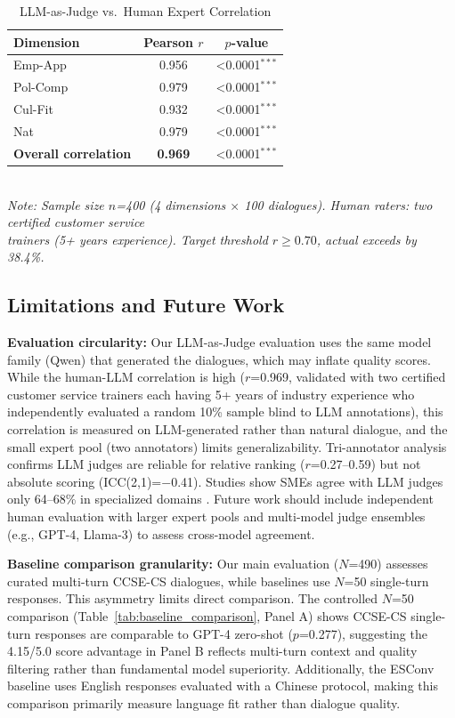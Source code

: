 \documentclass[11pt]{article}
\begin{document}
\begin{table}[t]
\begin{table}[t]
\centering
\caption{LLM-as-Judge vs.\ Human Expert Correlation}
\label{tab:llm_human_correlation}
\begin{tabular}{lcc}
\toprule
\textbf{Dimension} & \textbf{Pearson $r$} & \textbf{$p$-value} \\
\midrule
Emp-App & 0.956 & <0.0001$^{***}$ \\
Pol-Comp & 0.979 & <0.0001$^{***}$ \\
Cul-Fit & 0.932 & <0.0001$^{***}$ \\
Nat & 0.979 & <0.0001$^{***}$ \\
\midrule
\textbf{Overall correlation} & \textbf{0.969} & <0.0001$^{***}$ \\
\bottomrule
\end{tabular}
\smallskip
\\
\footnotesize{\textit{Note: Sample size $n$=400 (4 dimensions $\times$ 100 dialogues). Human raters: two certified customer service}}
\\
\footnotesize{\textit{trainers (5+ years experience). Target threshold $r \geq 0.70$, actual exceeds by 38.4\%.}}
\end{table}

\subsection{Limitations and Future Work}

\textbf{Evaluation circularity:} Our LLM-as-Judge evaluation uses the same model family (Qwen) that generated the dialogues, which may inflate quality scores. While the human-LLM correlation is high ($r$=0.969, validated with two certified customer service trainers each having 5+ years of industry experience who independently evaluated a random 10\% sample blind to LLM annotations), this correlation is measured on LLM-generated rather than natural dialogue, and the small expert pool (two annotators) limits generalizability. Tri-annotator analysis confirms LLM judges are reliable for relative ranking ($r$=0.27--0.59) but not absolute scoring (ICC(2,1)=$-$0.41). Studies show SMEs agree with LLM judges only 64--68\% in specialized domains \cite{llm_judge_limitations_2025}. Future work should include independent human evaluation with larger expert pools and multi-model judge ensembles (e.g., GPT-4, Llama-3) to assess cross-model agreement.

\textbf{Baseline comparison granularity:} Our main evaluation ($N$=490) assesses curated multi-turn CCSE-CS dialogues, while baselines use $N$=50 single-turn responses. This asymmetry limits direct comparison. The controlled $N$=50 comparison (Table~\ref{tab:baseline_comparison}, Panel A) shows CCSE-CS single-turn responses are comparable to GPT-4 zero-shot ($p$=0.277), suggesting the 4.15/5.0 score advantage in Panel B reflects multi-turn context and quality filtering rather than fundamental model superiority. Additionally, the ESConv baseline uses English responses evaluated with a Chinese protocol, making this comparison primarily measure language fit rather than dialogue quality.


\end{table}
\end{document}
